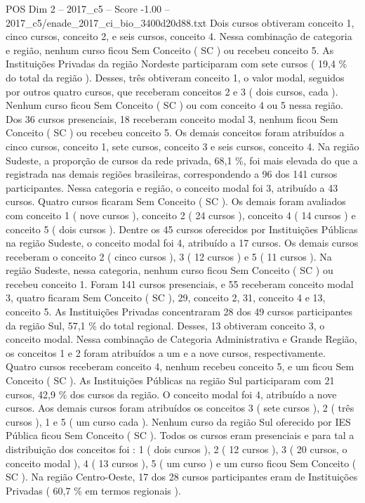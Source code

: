 \begin{textsample}{POS Dim 2 – 2017\_c5 – Score -1.00 – 2017\_c5/enade\_2017\_ci\_bio\_3400d20d88.txt}
Dois cursos obtiveram conceito 1, cinco cursos, conceito 2, e seis cursos, conceito 4.
Nessa combinação de categoria e região, nenhum curso ficou Sem Conceito ( SC ) ou recebeu conceito 5.
As Instituições Privadas da região Nordeste participaram com sete cursos ( 19,4 \% do total da região ).
Desses, três obtiveram conceito 1, o valor modal, seguidos por outros quatro cursos, que receberam conceitos 2 e 3 ( dois cursos, cada ).
Nenhum curso ficou Sem Conceito ( SC ) ou com conceito 4 ou 5 nessa região.
Dos 36 cursos presenciais, 18 receberam conceito modal 3, nenhum ficou Sem Conceito ( SC ) ou recebeu conceito 5.
Os demais conceitos foram atribuídos a cinco cursos, conceito 1, sete cursos, conceito 3 e seis cursos, conceito 4.
Na região Sudeste, a proporção de cursos da rede privada, 68,1 \%, foi mais elevada do que a registrada nas demais regiões brasileiras, correspondendo a 96 dos 141 cursos participantes.
Nessa categoria e região, o conceito modal foi 3, atribuído a 43 cursos.
Quatro cursos ficaram Sem Conceito ( SC ).
Os demais foram avaliados com conceito 1 ( nove cursos ), conceito 2 ( 24 cursos ), conceito 4 ( 14 cursos ) e conceito 5 ( dois cursos ).
Dentre os 45 cursos oferecidos por Instituições Públicas na região Sudeste, o conceito modal foi 4, atribuído a 17 cursos.
Os demais cursos receberam o conceito 2 ( cinco cursos ), 3 ( 12 cursos ) e 5 ( 11 cursos ).
Na região Sudeste, nessa categoria, nenhum curso ficou Sem Conceito ( SC ) ou recebeu conceito 1.
Foram 141 cursos presenciais, e 55 receberam conceito modal 3, quatro ficaram Sem Conceito ( SC ), 29, conceito 2, 31, conceito 4 e 13, conceito 5.
As Instituições Privadas concentraram 28 dos 49 cursos participantes da região Sul, 57,1 \% do total regional.
Desses, 13 obtiveram conceito 3, o conceito modal.
Nessa combinação de Categoria Administrativa e Grande Região, os conceitos 1 e 2 foram atribuídos a um e a nove cursos, respectivamente.
Quatro cursos receberam conceito 4, nenhum recebeu conceito 5, e um ficou Sem Conceito ( SC ).
As Instituições Públicas na região Sul participaram com 21 cursos, 42,9 \% dos cursos da região.
O conceito modal foi 4, atribuído a nove cursos.
Aos demais cursos foram atribuídos os conceitos 3 ( sete cursos ), 2 ( três cursos ), 1 e 5 ( um curso cada ).
Nenhum curso da região Sul oferecido por IES Pública ficou Sem Conceito ( SC ).
Todos os cursos eram presenciais e para tal a distribuição dos conceitos foi : 1 ( dois cursos ), 2 ( 12 cursos ), 3 ( 20 cursos, o conceito modal ), 4 ( 13 cursos ), 5 ( um curso ) e um curso ficou Sem Conceito ( SC ).
Na região Centro-Oeste, 17 dos 28 cursos participantes eram de Instituições Privadas ( 60,7 \% em termos regionais ).

\end{textsample}
